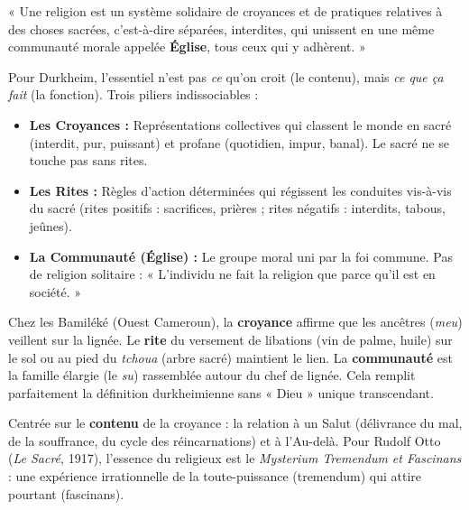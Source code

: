 \documentclass[11pt]{article}
\newcommand{\cle}[1]{{\popxbold\color{popdark}#1}}
\begin{document}
\begin{definition}
« Une religion est un \cle{système solidaire de croyances et de pratiques relatives à des choses sacrées, c'est-à-dire séparées, interdites, qui unissent en une même communauté morale appelée \textbf{Église}, tous ceux qui y adhèrent. »}
\end{definition}

\noindent Pour Durkheim, l'essentiel n'est pas \emph{ce} qu'on croit (le contenu), mais \emph{ce que ça fait} (la fonction). Trois piliers indissociables :
\begin{itemize}
    \item \textbf{Les Croyances :} Représentations collectives qui classent le monde en \cle{sacré} (interdit, pur, puissant) et \cle{profane} (quotidien, impur, banal). Le sacré ne se touche pas sans rites.
    \item \textbf{Les Rites :} Règles d'action déterminées qui régissent les conduites vis-à-vis du sacré (rites positifs : sacrifices, prières ; rites négatifs : interdits, tabous, jeûnes).
    \item \textbf{La Communauté (Église) :} Le groupe moral uni par la foi commune. Pas de religion solitaire : « L'individu ne fait la religion que parce qu'il est en société. »
\end{itemize}

\begin{exemplebox}
Chez les Bamiléké (Ouest Cameroun), la \textbf{croyance} affirme que les ancêtres (\emph{meu}) veillent sur la lignée. Le \textbf{rite} du versement de libations (vin de palme, huile) sur le sol ou au pied du \emph{tchoua} (arbre sacré) maintient le lien. La \textbf{communauté} est la famille élargie (le \emph{su}) rassemblée autour du chef de lignée. Cela remplit parfaitement la définition durkheimienne sans « Dieu » unique transcendant.
\end{exemplebox}

\begin{definition}
Centrée sur le \textbf{contenu} de la croyance : la relation à un \cle{Salut} (délivrance du mal, de la souffrance, du cycle des réincarnations) et à l'\cle{Au-delà}. Pour Rudolf Otto (\emph{Le Sacré}, 1917), l'essence du religieux est le \cle{\emph{Mysterium Tremendum et Fascinans}} : une expérience irrationnelle de la toute-puissance (tremendum) qui attire pourtant (fascinans).
\end{definition}
\end{document}
